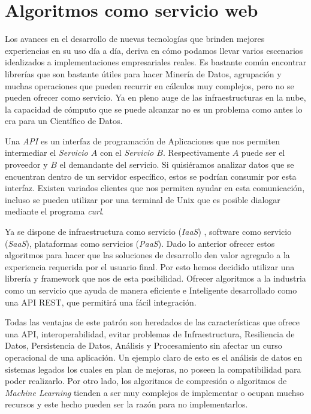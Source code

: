 \section{Algoritmos como servicio web }

	Los avances en el desarrollo de nuevas tecnologías que brinden mejores experiencias en su uso día a día, deriva en cómo podamos llevar varios escenarios idealizados a implementaciones empresariales reales. Es bastante común encontrar librerías que son bastante útiles para hacer Minería de Datos, agrupación y muchas operaciones que pueden recurrir en cálculos muy complejos, pero no se pueden ofrecer como servicio. Ya en pleno auge de las infraestructuras en la nube, la capacidad de cómputo que se puede alcanzar no es un problema como antes lo era para un Científico de Datos.


	Una \emph{API} es un interfaz de programación de Aplicaciones que nos permiten intermediar el \emph{Servicio $A$} con el \emph{Servicio $B$}. Respectivamente $A$ puede ser el proveedor y $B$ el demandante del servicio. Si quisiéramos analizar datos que se encuentran dentro de un servidor específico, estos se podrían consumir por esta interfaz. Existen variados clientes que nos permiten ayudar en esta comunicación, incluso se pueden utilizar por una terminal de {Unix} que es posible dialogar mediante el programa \emph{curl}.
	
	Ya se dispone de infraestructura como servicio (\emph{IaaS}) , software como servicio (\emph{SaaS}), plataformas como servicios (\emph{PaaS}). Dado lo anterior ofrecer estos algoritmos para hacer que las soluciones de desarrollo den valor agregado a la experiencia requerida por el usuario final. Por esto hemos decidido utilizar una librería y {framework} que nos de esta posibilidad. Ofrecer algoritmos a la industria como un servicio que ayuda de manera eficiente e Inteligente desarrollado como una API REST, que permitirá una fácil integración. 
	
	Todas las ventajas de este patrón son heredados de las características que ofrece una API, interoperabilidad, evitar problemas de Infraestructura, Resiliencia de Datos, Persistencia de Datos, Análisis y Procesamiento sin afectar un curso operacional de una aplicación. Un ejemplo claro de esto es el análisis de datos en sistemas legados los cuales en plan de mejoras, no poseen la compatibilidad para poder realizarlo. Por otro lado, los algoritmos de compresión o algoritmos de \emph{Machine Learning} tienden a ser muy complejos de implementar o ocupan muchso recursos y este hecho pueden ser la razón para no implementarlos. 
	
	
	
	